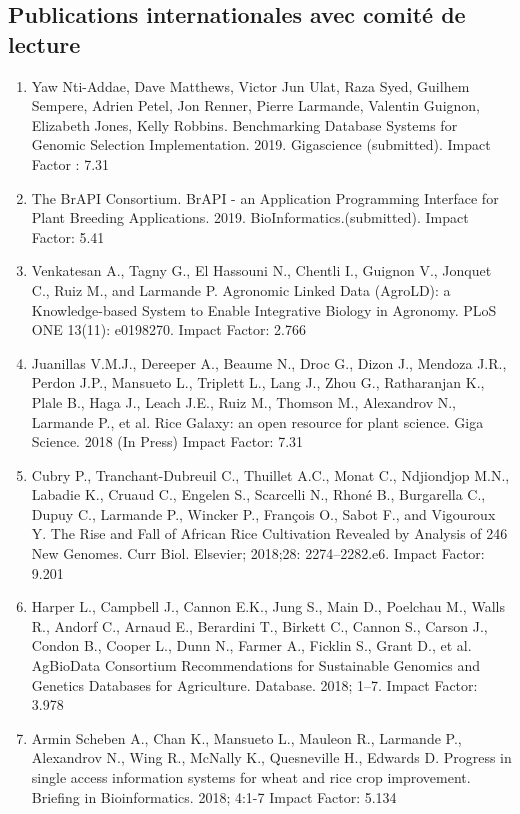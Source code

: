 \subsection*{Publications internationales avec comité de lecture} 

\begin{enumerate}
\item Yaw Nti-Addae, Dave Matthews, Victor Jun Ulat, Raza Syed, Guilhem Sempere, Adrien Petel, Jon Renner, Pierre Larmande, Valentin Guignon, Elizabeth Jones, Kelly Robbins. Benchmarking Database Systems for Genomic Selection Implementation. 2019. Gigascience (submitted). Impact Factor : 7.31
\item The BrAPI Consortium. BrAPI - an Application Programming Interface for Plant Breeding Applications. 2019. BioInformatics.(submitted). Impact Factor: 5.41
\item  Venkatesan A., Tagny G., El Hassouni N., Chentli I., Guignon V., Jonquet C., Ruiz M., and Larmande P. Agronomic Linked Data (AgroLD): a Knowledge-based System to Enable Integrative Biology in Agronomy. PLoS ONE 13(11): e0198270.  Impact Factor: 2.766
\item Juanillas V.M.J., Dereeper A., Beaume N., Droc G., Dizon J., Mendoza J.R., Perdon J.P., Mansueto L., Triplett L., Lang J., Zhou G., Ratharanjan K., Plale B., Haga J., Leach J.E., Ruiz M., Thomson M., Alexandrov N., Larmande P., et al. Rice Galaxy: an open resource for plant science. Giga Science. 2018 (In Press) Impact Factor: 7.31
\item	Cubry P., Tranchant-Dubreuil C., Thuillet A.C., Monat C., Ndjiondjop M.N., Labadie K., Cruaud C., Engelen S., Scarcelli N., Rhoné B., Burgarella C., Dupuy C., Larmande P., Wincker P., François O., Sabot F., and Vigouroux Y. The Rise and Fall of African Rice Cultivation Revealed by Analysis of 246 New Genomes. Curr Biol. Elsevier; 2018;28: 2274–2282.e6. Impact Factor: 9.201
\item Harper L., Campbell J., Cannon E.K., Jung S., Main D., Poelchau M., Walls R., Andorf C., Arnaud E., Berardini T., Birkett C., Cannon S., Carson J., Condon B., Cooper L., Dunn N., Farmer A., Ficklin S., Grant D., et al. AgBioData Consortium Recommendations for Sustainable Genomics and Genetics Databases for Agriculture. Database. 2018; 1–7. Impact Factor: 3.978
\item Armin Scheben A., Chan K., Mansueto L., Mauleon R., Larmande P., Alexandrov N., Wing R., McNally K., Quesneville
H., Edwards D. Progress in single access information systems for wheat and rice crop improvement. Briefing in Bioinformatics. 2018; 4:1-7 Impact Factor: 5.134

\end{enumerate}
